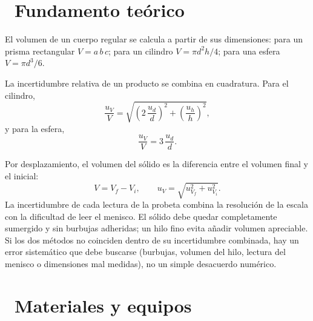 \documentclass[11pt,a4paper]{article}
\newcommand{\iconotexto}[2]{\textcolor{cyanNeon}{\faIcon{#1}}~#2}
\begin{document}
\section{\iconotexto{book-open}{Fundamento teórico}}

El volumen de un cuerpo regular se calcula a partir de sus dimensiones:
para un prisma rectangular $V = a\,b\,c$; para un cilindro
$V = \pi d^2 h/4$; para una esfera $V = \pi d^3/6$.

La incertidumbre relativa de un producto se combina en cuadratura. Para
el cilindro,
\[
  \frac{u_V}{V} = \sqrt{\left(2\,\frac{u_d}{d}\right)^2
                        + \left(\frac{u_h}{h}\right)^2},
\]
y para la esfera,
\[
  \frac{u_V}{V} = 3\,\frac{u_d}{d}.
\]

Por desplazamiento, el volumen del sólido es la diferencia entre el
volumen final y el inicial:
\[
  V = V_f - V_i, \qquad u_V = \sqrt{u_{V_f}^2 + u_{V_i}^2}.
\]
La incertidumbre de cada lectura de la probeta combina la resolución de
la escala con la dificultad de leer el menisco. El sólido debe quedar
completamente sumergido y sin burbujas adheridas; un hilo fino evita
añadir volumen apreciable. Si los dos métodos no coinciden dentro de su
incertidumbre combinada, hay un error sistemático que debe buscarse
(burbujas, volumen del hilo, lectura del menisco o dimensiones mal
medidas), no un simple desacuerdo numérico.

\begin{center}
\par{}
\end{center}

\section{\iconotexto{box-open}{Materiales y equipos}}
\end{document}
